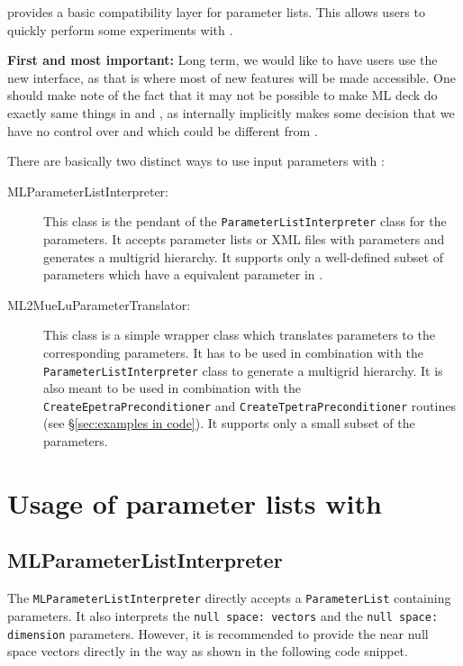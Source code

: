
\label{sec:ml_options}
\muelu provides a basic compatibility layer for \ml parameter lists. This allows \ml users to quickly perform some experiments with \muelu.

\textbf{First and most important: } Long term, we would like to have users use the new \muelu interface, as that is where most of new features will be made accessible. One should make note of the fact that it may not be possible to make ML deck do exactly same things in \ml and \muelu, as internally \ml implicitly makes some decision that we have no control over and which could be different from \muelu.

\noindent There are basically two distinct ways to use \ml input parameters with \muelu:
\begin{description}
\item[MLParameterListInterpreter:] This class is the pendant of the \texttt{ParameterListInterpreter} class for the \muelu parameters. It accepts parameter lists or XML files with \ml parameters and generates a \muelu multigrid hierarchy. It supports only a well-defined subset of \ml parameters which have a equivalent parameter in \muelu.
\item[ML2MueLuParameterTranslator:] This class is a simple wrapper class which translates \ml parameters to the corresponding \muelu parameters. It has to be used in combination with the \muelu \texttt{ParameterListInterpreter} class to generate a \muelu multigrid hierarchy. It is also meant to be used in combination with the \texttt{CreateEpetraPreconditioner} and \texttt{CreateTpetraPreconditioner} routines (see \S\ref{sec:examples in code}). It supports only a small subset of the \ml parameters.
\end{description}

\section{Usage of \ml parameter lists with \muelu}

\subsection{MLParameterListInterpreter}

The \texttt{MLParameterListInterpreter} directly accepts a \texttt{ParameterList} containing \ml parameters. It also interprets the \texttt{null space: vectors} and the \texttt{null space: dimension} \ml parameters. However, it is recommended to provide the near null space vectors directly in the \muelu way as shown in the following code snippet.

